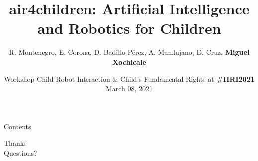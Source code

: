 \documentclass[xcolor={dvipsnames},aspectratio=169,10pt]{beamer}
\title{air4children: Artificial Intelligence and Robotics for Children}
\author{
R. Montenegro,
E. Corona,
D. Badillo-P\'erez,
A. Mandujano,
D. Cruz,
{\bf Miguel Xochicale}
}
\date{
Workshop Child-Robot Interaction \& Child's Fundamental Rights at {\bf \#HRI2021} \\
March 08, 2021
}
\institute{
	\faEnvelope   air4children@gmail.com \\
	\faGithubAlt @air4children \faTwitter @air4children  
		}
\begin{document}
\maketitle

\begin{frame}{Contents}
    \tableofcontents
\end{frame}






\begin{frame}[standout]
  Thanks \\
  Questions?
\end{frame}
\end{document}
